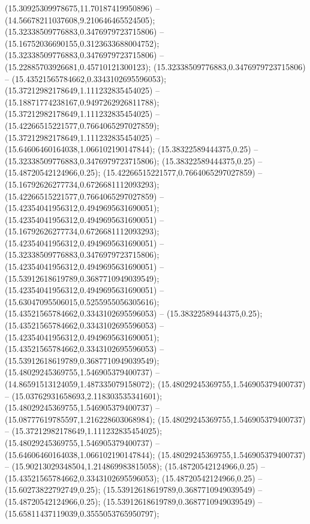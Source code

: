 (15.30925309978675,11.70187419950896) -- (14.56678211037608,9.210646465524505);
 (15.32338509776883,0.3476979723715806) -- (15.16752036690155,0.3123633688004752);
 (15.32338509776883,0.3476979723715806) -- (15.22885703926681,0.45710121300123);
 (15.32338509776883,0.3476979723715806) -- (15.43521565784662,0.3343102695596053);
 (15.37212982178649,1.111232835454025) -- (15.18871774238167,0.9497262926811788);
 (15.37212982178649,1.111232835454025) -- (15.42266515221577,0.7664065297027859);
 (15.37212982178649,1.111232835454025) -- (15.64606460164038,1.066102190147844);
 (15.38322589444375,0.25) -- (15.32338509776883,0.3476979723715806);
 (15.38322589444375,0.25) -- (15.48720542124966,0.25);
 (15.42266515221577,0.7664065297027859) -- (15.16792626277734,0.6726681112093293);
 (15.42266515221577,0.7664065297027859) -- (15.42354041956312,0.4949695631690051);
 (15.42354041956312,0.4949695631690051) -- (15.16792626277734,0.6726681112093293);
 (15.42354041956312,0.4949695631690051) -- (15.32338509776883,0.3476979723715806);
 (15.42354041956312,0.4949695631690051) -- (15.53912618619789,0.3687710949039549);
 (15.42354041956312,0.4949695631690051) -- (15.63047095506015,0.5255955056305616);
 (15.43521565784662,0.3343102695596053) -- (15.38322589444375,0.25);
 (15.43521565784662,0.3343102695596053) -- (15.42354041956312,0.4949695631690051);
 (15.43521565784662,0.3343102695596053) -- (15.53912618619789,0.3687710949039549);
 (15.48029245369755,1.546905379400737) -- (14.86591513124059,1.487335079158072);
 (15.48029245369755,1.546905379400737) -- (15.03762931658693,2.118303535341601);
 (15.48029245369755,1.546905379400737) -- (15.08777619785597,1.216228603068984);
 (15.48029245369755,1.546905379400737) -- (15.37212982178649,1.111232835454025);
 (15.48029245369755,1.546905379400737) -- (15.64606460164038,1.066102190147844);
 (15.48029245369755,1.546905379400737) -- (15.90213029348504,1.214869983815058);
 (15.48720542124966,0.25) -- (15.43521565784662,0.3343102695596053);
 (15.48720542124966,0.25) -- (15.60273822792749,0.25);
 (15.53912618619789,0.3687710949039549) -- (15.48720542124966,0.25);
 (15.53912618619789,0.3687710949039549) -- (15.65811437119039,0.3555053765950797);
